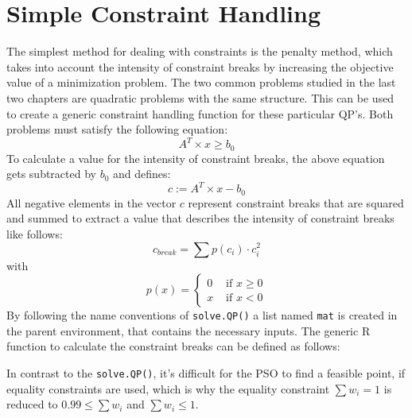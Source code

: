 \documentclass[
  oneside]{book}
\newenvironment{Shaded}{\begin{snugshade}}{\end{snugshade}}
\newcommand{\ControlFlowTok}[1]{\textcolor[rgb]{0.13,0.29,0.53}{\textbf{#1}}}
\newcommand{\DecValTok}[1]{\textcolor[rgb]{0.00,0.00,0.81}{#1}}
\newcommand{\FunctionTok}[1]{\textcolor[rgb]{0.00,0.00,0.00}{#1}}
\newcommand{\NormalTok}[1]{#1}
\newcommand{\OtherTok}[1]{\textcolor[rgb]{0.56,0.35,0.01}{#1}}
\newcommand{\SpecialCharTok}[1]{\textcolor[rgb]{0.00,0.00,0.00}{#1}}
\begin{document}
\hypertarget{simple-constraint-handling}{%
\section{Simple Constraint Handling}\label{simple-constraint-handling}}

The simplest method for dealing with constraints is the penalty method, which takes into account the intensity of constraint breaks by increasing the objective value of a minimization problem. The two common problems studied in the last two chapters are quadratic problems with the same structure. This can be used to create a generic constraint handling function for these particular QP's. Both problems must satisfy the following equation:
\[
  A^T \times x  \geq b_0
\]
To calculate a value for the intensity of constraint breaks, the above equation gets subtracted by \(b_0\) and defines:
\[
  c := A^T \times x - b_0
\]
All negative elements in the vector \(c\) represent constraint breaks that are squared and summed to extract a value that describes the intensity of constraint breaks like follows:
\[
  c_{break} = \sum p(c_i) \cdot c_i^2
\]
with
\[
 p(x) =   \begin{cases}
  0 &\text{ if }x \geq 0\\
  x &\text{ if }x < 0
  \end{cases}
\]
By following the name conventions of \texttt{solve.QP()} a list named \texttt{mat} is created in the parent environment, that contains the necessary inputs. The generic R function to calculate the constraint breaks can be defined as follows:

\begin{Shaded}
\end{Shaded}

In contrast to the \texttt{solve.QP()}, it's difficult for the PSO to find a feasible point, if equality constraints are used, which is why the equality constraint \(\textstyle\sum w_i = 1\) is reduced to \(0.99 \leq \textstyle\sum w_i\) and \(\textstyle\sum w_i \leq 1\).
\end{document}
